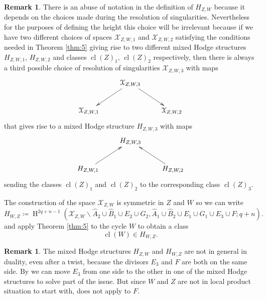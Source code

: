 \documentclass[11pt,a4paper]{amsart}
\newcommand{\caX}{\mathcal{X}}
\DeclareMathOperator {\cl}{cl}
\DeclareMathOperator{\rH}{H}
\numberwithin{equation}{section}
\theoremstyle{plain}
\theoremstyle{definition}
\newtheorem{rmk}[prop]{Remark}
\begin{document}
  \begin{rmk}\label{rmk-5-10}
    There is an abuse of notation in the definition of $H_{Z,W}$
    because it depends on the choices  made during the resolution of
    singularities. Nevertheless for the purposes of defining the
    height this choice will be irrelevant because if we have two
    different choices of spaces $\caX_{Z,W,1}$ and $\caX_{Z,W,2}$
    satisfying the conditions needed in Theorem \ref{thm:5} giving rise
    to two different mixed Hodge structures $H_{Z,W,1}$,
    $H_{Z,W,2}$ and classes $\cl(Z)_{1}$, $\cl(Z)_{2}$ respectively,
    then  there is always a third possible choice of resolution of
    singularities $\caX_{Z,W,3}$ with maps
    \begin{displaymath}
      \xymatrix{
        &\caX_{Z,W,3}\ar[dl] \ar[dr] & \\
        \caX_{Z,W,1} && \caX_{Z,W,2}
      }
    \end{displaymath}
    that gives rise to a mixed Hodge structure $H_{Z,W,3}$ with maps
    \begin{displaymath}
      \xymatrix{
        &H_{Z,W,3}& \\
        H_{Z,W,1}\ar[ur] && H_{Z,W,2}\ar[ul]
      }
    \end{displaymath}
    sending the classes $\cl(Z)_{1}$ and $\cl(Z)_{2}$ to the
    corresponding class $\cl(Z)_{3}$.
  \end{rmk}

  The construction of the space $\caX_{Z,W}$ is symmetric in $Z$ and
  $W$ so we can write
  \begin{displaymath}
    H_{W,Z}\coloneqq \rH^{2q+n-1}
    (\caX_{Z,W}\smallsetminus \widehat A_2\cup
    \widehat B_1\cup E_2\cup G_2   , \widehat A_1\cup
    \widehat B_2\cup E_1\cup G_1\cup E_3\cup F;q +n).
  \end{displaymath}
 and apply Theorem \ref{thm:5} to the cycle $W$ to obtain a
  class
  \begin{displaymath}
    \cl(W)\in H_{W,Z}.
  \end{displaymath}

  \begin{rmk}\label{rem:9}
    The mixed Hodge structures $H_{Z,W}$ and $H_{W,Z}$ are not in
    general in duality, even after a twist, because the divisors $E_3$  and $F$ are both on
    the same side. By \cite[Lemma 1.13]{BGGP:Height} we can move
    $E_{3}$ from one side to the other in one of the mixed Hodge
    structures to solve part of the issue. But since $W$ and $Z$ are
    not in local product situation to start with, \cite[Lemma
    1.13]{BGGP:Height} does not apply to $F$.
  \end{rmk}
\end{document}
